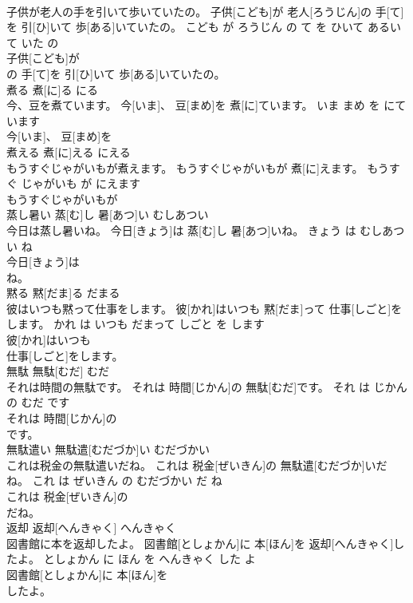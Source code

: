 \documentclass[8pt]{extreport}
\begin{document}
\begin{CJK}{UTF8}{min}
\\	子供が老人の手を引いて歩いていたの。	子供[こども]が 老人[ろうじん]の 手[て]を 引[ひ]いて 歩[ある]いていたの。	こども が ろうじん の て を ひいて あるいて いた の	
\\	子供[こども]が
\\	の 手[て]を 引[ひ]いて 歩[ある]いていたの。			
\\	煮る	煮[に]る	にる	
\\	今、豆を煮ています。	今[いま]、 豆[まめ]を 煮[に]ています。	いま まめ を にて います	
\\	今[いま]、 豆[まめ]を
\\	煮える	煮[に]える	にえる	
\\	もうすぐじゃがいもが煮えます。	もうすぐじゃがいもが 煮[に]えます。	もうすぐ じゃがいも が にえます	
\\	もうすぐじゃがいもが
\\	蒸し暑い	蒸[む]し 暑[あつ]い	むしあつい	
\\	今日は蒸し暑いね。	今日[きょう]は 蒸[む]し 暑[あつ]いね。	きょう は むしあつい ね	
\\	今日[きょう]は
\\	ね。			
\\	黙る	黙[だま]る	だまる	
\\	彼はいつも黙って仕事をします。	彼[かれ]はいつも 黙[だま]って 仕事[しごと]をします。	かれ は いつも だまって しごと を します	
\\	彼[かれ]はいつも
\\	仕事[しごと]をします。			
\\	無駄	無駄[むだ]	むだ	
\\	それは時間の無駄です。	それは 時間[じかん]の 無駄[むだ]です。	それ は じかん の むだ です	
\\	それは 時間[じかん]の
\\	です。			
\\	無駄遣い	無駄遣[むだづか]い	むだづかい	
\\	これは税金の無駄遣いだね。	これは 税金[ぜいきん]の 無駄遣[むだづか]いだね。	これ は ぜいきん の むだづかい だ ね	
\\	これは 税金[ぜいきん]の
\\	だね。			
\\	返却	返却[へんきゃく]	へんきゃく	
\\	図書館に本を返却したよ。	図書館[としょかん]に 本[ほん]を 返却[へんきゃく]したよ。	としょかん に ほん を へんきゃく した よ	
\\	図書館[としょかん]に 本[ほん]を
\\	したよ。			

\end{CJK}
\end{document}
